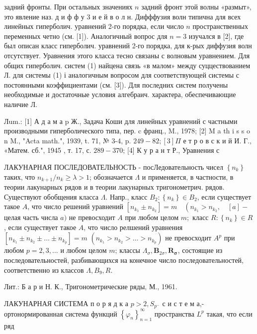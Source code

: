 \documentclass[10pt]{article}
\begin{document}
задний фронты. При остальных значениях $n$ задний фронт этой волны «размыт», это явление наз. д и ф ф у 3 и е й в о л н. Дифффузия волн типична для всех линейных гиперболич. уравнений 2-го порядка, если число $n$ пространственных переменных четно (см. [1]). Аналогичный вопрос для $n=3$ изучался в [2], где был описан класс гиперболич. уравнений 2-го порядка, для к-рых диффузия волн отсутствует. Уравнения этого класса тесно связаны с волновым уравнением. Для общих гиперболич. систем (1) найцена связь «в малом» между суццествованием Л. для системы (1) і аналогичным вопросом для соответствующей системы с постоянными коэффициентами (см. [3]). Для последних систем получены необходимые и достаточные условия алгебраич. характера, обеспечивающие наличие Л.



Лum.: [1] А д а м а p Ж., Задача Коши для линейных уравнений с частными производными гиперболического типа, пер. c франц., M., 1978; [2] M a th i s s o n M., "Acta math.", 1939, t. 71, № 3-4, p. $249-82 ;[3] \Pi$ е т р о в с к и й И. Г., «Матем. сб.", 1945 , т. 17, с. $289-370$; [4] К у р а н т Р., Уравнения с



ЛАКУНАРНАЯ ПОСЛЕДОВАТЕЛЬНОСТЬ - посЛедовательность чисел $\left\{n_{k}\right\}$ таких, что $n_{k+1} / n_{k} \geqslant \lambda>1$; обозначается $\Lambda$ и применяется, в частности, в теории лакунарных рядов и в теории лакунарных тригонометрич. рядов. Существуют обобщения класса $\Lambda$. Напр., класс $B_{2}:\left\{n_{k}\right\} \in B_{2}$, если существует такое $A$, что число решений уравнений $\left[n_{k_{1}} \pm n_{k_{2}}\right]=m \quad\left(n_{k_{1}}>n_{k_{2}}, \quad[a]-\right.$ целая часть числа $a)$ не превосходит $A$ при любом целом $m ;$ класс $R:\left\{n_{k}\right\} \in R$, если существует такое $A$, что число релшений уравнения $\left[n_{k_{1}} \pm n_{k_{2}} \pm \ldots \pm n_{k_{p}}\right]=m$ $\left(n_{k_{1}}>n_{k_{2}}>\ldots>n_{k_{p}}\right)$ не превосходит $A^{p}$ при любом $p=2,3, \ldots$ и любом целом $m$; классы $\Lambda_{\sigma}, \boldsymbol{B}_{2 \sigma}, \boldsymbol{R}_{\boldsymbol{\sigma}}$, состоящие из последовательностей, разбивающихся на конечное число последовательностей, соответственно из классов $\Lambda, B_{9}, R$.



Лит.: Б а р и Н. К., Тригонометрические ряды, М., 1961.



ЛАКУНАРНАЯ СИСТЕМА п о р я д к а $p>2, S_{p^{-}}$ с и с т е м а,- ортонормированная система функций $\left\{\varphi_{n}\right\}_{n=1}^{\infty}$ пространства $L^{p}$ такая, что если ряд
\end{document}
